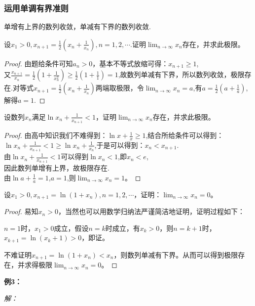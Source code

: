 \subsubsection{运用单调有界准则}

单增有上界的数列收敛，单减有下界的数列收敛.

\begin{example}
	设$x_1>0,x_{n+1}=\frac{1}{2}(x_n+\frac{1}{x_n}),n=1,2,\cdots $.证明$\lim_{n \to \infty}x_n$存在，并求此极限。
	\begin{proof}
		由题给条件可知$a_n>0$，基本不等式放缩可得：$x_{n+1}\geq 1$,\\
又$\frac{x_{n+1}}{x_n}=\frac{1}{2}(1+\frac{1}{x_{n}^{2}})\geq\frac{1}{2}(1+\frac{1}{1})=1$,故数列单减有下界，所以数列收敛，极限存在.对等式$x_{n+1}=\frac{1}{2}(x_n+\frac{1}{x_n})$两端取极限，令$\lim_{n \to \infty}x_n=a$,有$a=\frac{1}{2}(a+\frac{1}{a})$,解得$a=1$.
	\end{proof}
\end{example}

\begin{example}
	设数列${x_n}$满足$\ln x_n+\frac{1}{x_{n+1}}<1$，证明$\lim_{n \to \infty}x_n$存在，并求此极限。
	\begin{proof}
		由高中知识我们不难得到：$\ln x+\frac{1}{x}\geq1$,结合所给条件可以得到：$\ln x_n+\frac{1}{x_{n+1}}<1\geq\ln x_n+\frac{1}{x_n}$,于是可以得到：$x_n<x_{n+1}$.\\
由$\ln x_n+\frac{1}{x_{n+1}}<1$可以得到$\ln x_n<1$,即$x_n<e$,\\
因此数列单增有上界，故极限存在.\\
由$\ln a+\frac{1}{a}=1$,$a=1$,则$\lim_{n \to \infty}x_n=1$。
	\end{proof}
\end{example}

\begin{example}
	设$x_1>0,x_{n+1}=\ln(1+x_n),n=1,2,\cdots$，证明：$\lim_{n \to \infty}x_n=0$。
	\begin{proof}
		易知$x_n>0$，当然也可以用数学归纳法严谨简洁地证明，证明过程如下：

$n=1$时，$x_1>0$成立，假设$n=k$时成立，有$x_k>0$，则$n=k+1$时，$x_{k+1}=\ln(x_k+1)>0$，即证。

不难证明$x_{n+1}=\ln(1+x_n)<x_n$，则数列单减有下界。从而可以得到极限存在，并求得极限$\lim_{n \to \infty}x_n=0$。
	\end{proof}
\end{example}
\textbf{例3：}

\textit{解：}



